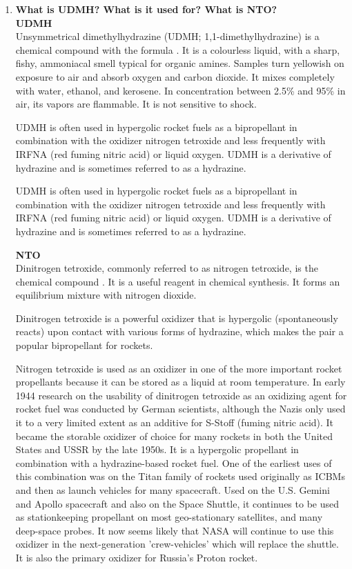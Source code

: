 \documentclass{article}
\begin{document}
\begin{enumerate}
	\item {{\bf What is UDMH? What is it used for? What is NTO?}}\\

{\bf UDMH}\\
Unsymmetrical dimethylhydrazine (UDMH; 1,1-dimethylhydrazine) is a chemical compound with the formula . It is a colourless liquid, with a sharp, fishy, ammoniacal smell typical for organic amines. Samples turn yellowish on exposure to air and absorb oxygen and carbon dioxide. It mixes completely with water, ethanol, and kerosene. In concentration between 2.5\% and 95\% in air, its vapors are flammable. It is not sensitive to shock.

UDMH is often used in hypergolic rocket fuels as a bipropellant in combination with the oxidizer nitrogen tetroxide and less frequently with IRFNA (red fuming nitric acid) or liquid oxygen. UDMH is a derivative of hydrazine and is sometimes referred to as a hydrazine.

UDMH is often used in hypergolic rocket fuels as a bipropellant in combination with the oxidizer nitrogen tetroxide and less frequently with IRFNA (red fuming nitric acid) or liquid oxygen. UDMH is a derivative of hydrazine and is sometimes referred to as a hydrazine. \cite{udmh}

{\bf NTO}\\
Dinitrogen tetroxide, commonly referred to as nitrogen tetroxide, is the chemical compound . It is a useful reagent in chemical synthesis. It forms an equilibrium mixture with nitrogen dioxide.

Dinitrogen tetroxide is a powerful oxidizer that is hypergolic (spontaneously reacts) upon contact with various forms of hydrazine, which makes the pair a popular bipropellant for rockets.

Nitrogen tetroxide is used as an oxidizer in one of the more important rocket propellants because it can be stored as a liquid at room temperature. In early 1944 research on the usability of dinitrogen tetroxide as an oxidizing agent for rocket fuel was conducted by German scientists, although the Nazis only used it to a very limited extent as an additive for S-Stoff (fuming nitric acid). It became the storable oxidizer of choice for many rockets in both the United States and USSR by the late 1950s. It is a hypergolic propellant in combination with a hydrazine-based rocket fuel. One of the earliest uses of this combination was on the Titan family of rockets used originally as ICBMs and then as launch vehicles for many spacecraft. Used on the U.S. Gemini and Apollo spacecraft and also on the Space Shuttle, it continues to be used as stationkeeping propellant on most geo-stationary satellites, and many deep-space probes. It now seems likely that NASA will continue to use this oxidizer in the next-generation 'crew-vehicles' which will replace the shuttle. It is also the primary oxidizer for Russia's Proton rocket.


\end{enumerate}
\end{document}
